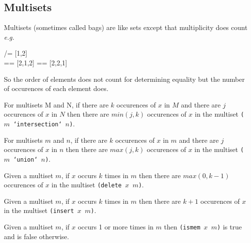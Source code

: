 \documentclass[11pt]{article}
\begin{document}
\subsection{Multisets}

Multisets (sometimes called bags) are like sets except that
 multiplicity does count {\em{e.g.}} 
\begin{program*}
\> [1,2,2] /= [1,2] \\
\> [1,2,2] == [2,1,2] == [2,2,1] \\
\end{program*}
So the order of elements does not count for determining equality but the number
of occurences of each element does. 

\begin{definition}
For multisets M and N, if there are $k$ occurences of $x$ in $M$ and there are
$j$ occurences of $x$ in $N$ then there are $min(j,k)$ occurences of $x$ in the
multiset {\tt{($m$ `intersection` $n$)}}.
\end{definition}


\begin{definition}
For multisets $m$ and $n$, if there are $k$ occurences of $x$ in $m$ and there
are $j$ occurences of $x$ in $n$ then there are $max(j,k)$ occurences of $x$ in
the multiset {\tt{($m$ `union` $n$)}}.
\end{definition}


\begin{definition}
Given a multiset $m$, if $x$ occurs $k$ times in $m$ then there are
$max(0,k-1)$ occurences of $x$ in the multiset {\tt{(delete $x$ $m$)}}.
\end{definition}


\begin{definition}
Given a multiset $m$, if $x$ occurs $k$ times in $m$ then there are
$k+1$ occurences of $x$ in the multiset {\tt{(insert $x$ $m$)}}.
\end{definition}


\begin{definition}
Given a multiset $m$, if $x$ occurs 1 or more times in $m$ then {\tt{(ismem $x$
$m$)}} is true and is false otherwise.
\end{definition}


\end{document}
